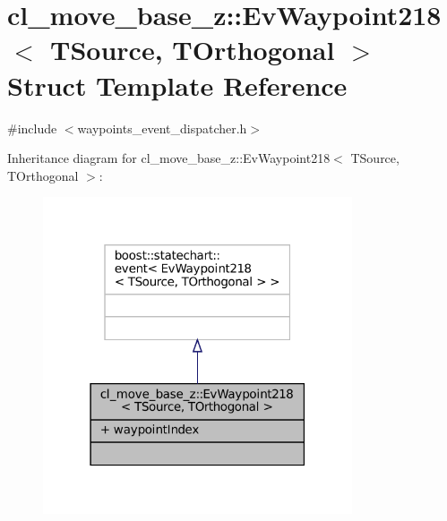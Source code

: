 \hypertarget{structcl__move__base__z_1_1EvWaypoint218}{}\section{cl\+\_\+move\+\_\+base\+\_\+z\+:\+:Ev\+Waypoint218$<$ T\+Source, T\+Orthogonal $>$ Struct Template Reference}
\label{structcl__move__base__z_1_1EvWaypoint218}


{\ttfamily \#include $<$waypoints\+\_\+event\+\_\+dispatcher.\+h$>$}



Inheritance diagram for cl\+\_\+move\+\_\+base\+\_\+z\+:\+:Ev\+Waypoint218$<$ T\+Source, T\+Orthogonal $>$\+:
\nopagebreak
\begin{figure}[H]
\begin{center}
\leavevmode
\includegraphics[width=259pt]{structcl__move__base__z_1_1EvWaypoint218__inherit__graph}
\end{center}
\end{figure}


